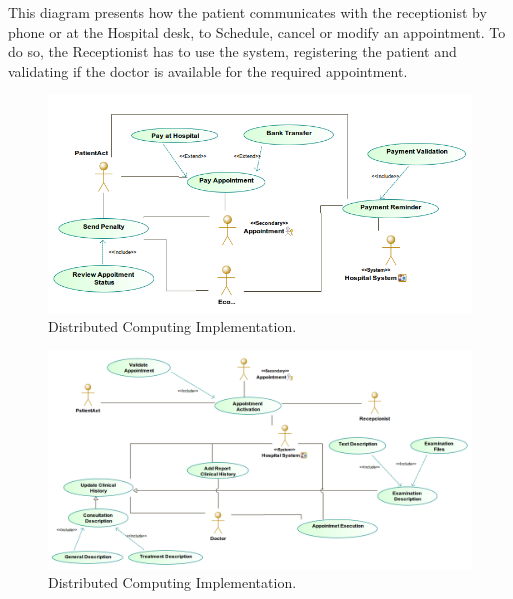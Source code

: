 \documentclass{article}
\begin{document}
            This diagram presents how the patient communicates with the receptionist by phone or at the Hospital desk, to Schedule, cancel or modify an appointment. To do so, the Receptionist has to use the
            system, registering the patient and validating if the doctor is available for the required appointment.

            
            \begin{figure}[H]
                \centering 
                \includegraphics[width=1\linewidth]{./img/payments.png}
                \caption{Distributed Computing Implementation.}
                \label{fig:architecture}
            \end{figure}
            \begin{figure}[H]
                \centering 
                \includegraphics[width=1\linewidth]{./img/cHistories.png}
                \caption{Distributed Computing Implementation.}
                \label{fig:architecture}
            \end{figure}
\end{document}
